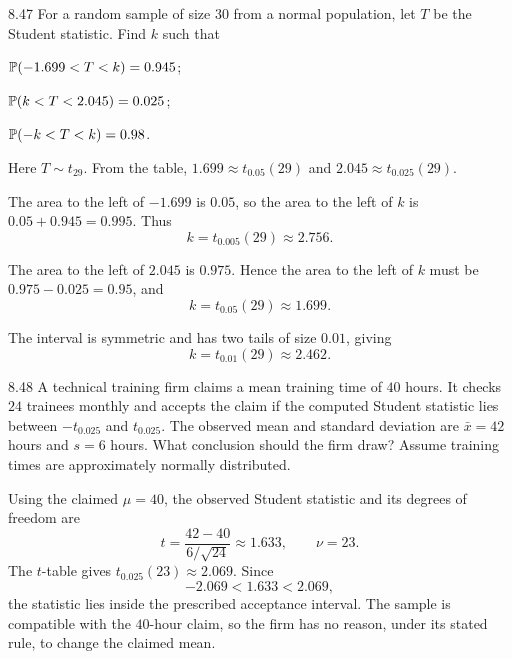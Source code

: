 \documentclass[11pt,oneside]{article}
\begin{document}
\begin{exercise}{8.47}
For a random sample of size $30$ from a normal population, let $T$ be the Student statistic. Find $k$ such that
\begin{exercisesubparts}
\item $\mathbb{P}(-1.699<T<k)=0.945$;
\item $\mathbb{P}(k<T<2.045)=0.025$;
\item $\mathbb{P}(-k<T<k)=0.98$.
\end{exercisesubparts}
\end{exercise}
\begin{solution}
Here $T\sim t_{29}$. From the table, $1.699\approx t_{0.05}(29)$ and $2.045\approx t_{0.025}(29)$.
\begin{exercisesubparts}
\item The area to the left of $-1.699$ is $0.05$, so the area to the left of $k$ is $0.05+0.945=0.995$. Thus
\[
\boxed{k=t_{0.005}(29)\approx2.756}.
\]
\item The area to the left of $2.045$ is $0.975$. Hence the area to the left of $k$ must be $0.975-0.025=0.95$, and
\[
\boxed{k=t_{0.05}(29)\approx1.699}.
\]
\item The interval is symmetric and has two tails of size $0.01$, giving
\[
\boxed{k=t_{0.01}(29)\approx2.462}.
\]
\end{exercisesubparts}
\end{solution}

\begin{exercise}{8.48}
A technical training firm claims a mean training time of $40$ hours. It checks $24$ trainees monthly and accepts the claim if the computed Student statistic lies between $-t_{0.025}$ and $t_{0.025}$. The observed mean and standard deviation are $\bar x=42$ hours and $s=6$ hours. What conclusion should the firm draw? Assume training times are approximately normally distributed.
\end{exercise}
\begin{solution}
Using the claimed $\mu=40$, the observed Student statistic and its degrees of freedom are
\[
t=\frac{42-40}{6/\sqrt{24}}\approx1.633, \qquad\nu=23.
\]
The $t$-table gives $t_{0.025}(23)\approx2.069$. Since
\[
-2.069<1.633<2.069,
\]
the statistic lies inside the prescribed acceptance interval. The sample is compatible with the $40$-hour claim, so the firm has no reason, under its stated rule, to change the claimed mean.
\end{solution}
\end{document}
